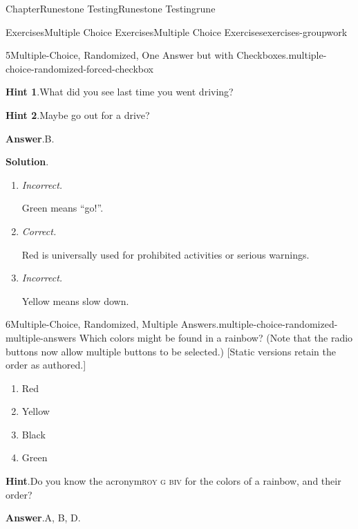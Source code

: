 \documentclass[oneside,10pt,]{book}
\newcommand{\blocktitlefont}{\relax}
\newcommand{\acronym}[1]{\textsc{\MakeLowercase{#1}}}
\newcommand{\lititle}[1]{{\slshape#1}}
\numberwithin{equation}{section}
\begin{document}
\begin{chapterptx}{Chapter}{Runestone Testing}{}{Runestone Testing}{}{}{rune}
\begin{exercises-section}{Exercises}{Multiple Choice Exercises}{}{Multiple Choice Exercises}{}{}{exercises-groupwork}
\begin{divisionexercise}{5}{Multiple-Choice, Randomized, One Answer but with Checkboxes.}{}{multiple-choice-randomized-forced-checkbox}
\begin{enumerate}[label={\Alph*.}]
\end{enumerate}
%
\par\smallskip%
\noindent\textbf{\blocktitlefont Hint 1}.\hypertarget{multiple-choice-randomized-forced-checkbox-4}{}\quad{}What did you see last time you went driving?%
\par\smallskip%
\noindent\textbf{\blocktitlefont Hint 2}.\hypertarget{multiple-choice-randomized-forced-checkbox-5}{}\quad{}Maybe go out for a drive?%
\par\smallskip%
\noindent\textbf{\blocktitlefont Answer}.\hypertarget{multiple-choice-randomized-forced-checkbox-6}{}\quad{}B.%
\par\smallskip%
\noindent\textbf{\blocktitlefont Solution}.\hypertarget{multiple-choice-randomized-forced-checkbox-7}{}\quad{}%
\begin{enumerate}[label={\Alph*.}]
\item{}\lititle{Incorrect.}\par%
Green means ``go!''.%
\item{}\lititle{Correct.}\par%
Red is universally used for prohibited activities or serious warnings.%
\item{}\lititle{Incorrect.}\par%
Yellow means slow down.%
\end{enumerate}
%
\end{divisionexercise}%
\begin{divisionexercise}{6}{Multiple-Choice, Randomized, Multiple Answers.}{}{multiple-choice-randomized-multiple-answers}%
%
Which colors might be found in a rainbow?  (Note that the radio buttons now allow multiple buttons to be selected.) [Static versions retain the order as authored.]%
\par
%
\begin{enumerate}[label={\Alph*.}]
\item{}Red%
\item{}Yellow%
\item{}Black%
\item{}Green%
\end{enumerate}
%
\par\smallskip%
\noindent\textbf{\blocktitlefont Hint}.\hypertarget{multiple-choice-randomized-multiple-answers-4}{}\quad{}Do you know the acronym\textellipsis{}\acronym{ROY G BIV} for the colors of a rainbow, and their order?%
\par\smallskip%
\noindent\textbf{\blocktitlefont Answer}.\hypertarget{multiple-choice-randomized-multiple-answers-5}{}\quad{}A, B, D.%

\end{divisionexercise}
\end{exercises-section}
\end{chapterptx}
\end{document}
